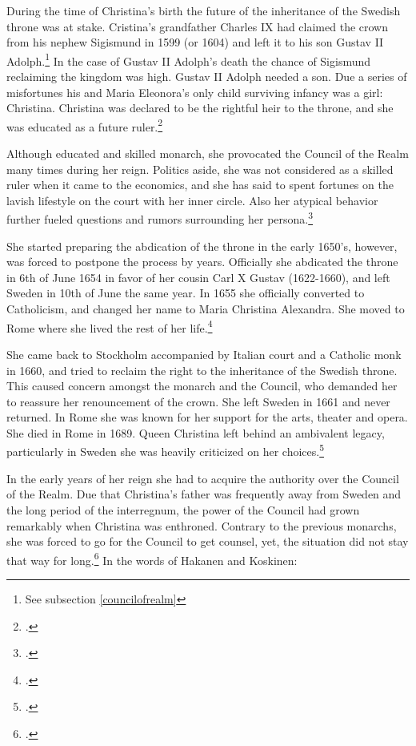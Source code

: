 During the time of Christina's birth the future of the inheritance of the Swedish throne was at stake. Cristina's grandfather Charles IX had claimed the crown from his nephew Sigismund in 1599 (or 1604) and left it to his son Gustav II Adolph.\footnote{See subsection \ref{councilofrealm}} In the case of Gustav II Adolph's death the chance of Sigismund reclaiming the kingdom was high. Gustav II Adolph needed a son. Due a series of misfortunes his and Maria Eleonora's only child surviving infancy was a girl: Christina. Christina was declared to be the rightful heir to the throne, and she was educated as a future ruler.\footcite[pp. 185-189.]{lappalainen14}

Although educated and skilled monarch, she provocated the Council of the Realm many times during her reign. Politics aside, she was not considered as a skilled ruler when it came to the economics, and she has said to spent fortunes on the lavish lifestyle on the court with her inner circle. Also her atypical behavior further fueled questions and rumors surrounding her persona.\footcite{makelaAlitaloEtAl2000}

She started preparing the abdication of the throne in the early 1650's, however, was forced to postpone the process by years. Officially she abdicated the throne in 6th of June 1654 in favor of her cousin Carl X Gustav (1622-1660), and left Sweden in 10th of June the same year. In 1655 she officially converted to Catholicism, and changed her name to Maria Christina Alexandra. She moved to Rome where she lived the rest of her life.\footcite{makelaAlitaloEtAl2000}

She came back to Stockholm accompanied by Italian court and a Catholic monk in 1660, and tried to reclaim the right to the inheritance of the Swedish throne. This caused concern amongst the monarch and the Council, who demanded her to reassure her renouncement of the crown. She left Sweden in 1661 and never returned. In Rome she was known for her support for the arts, theater and opera. She died in Rome in 1689. Queen Christina left behind an ambivalent legacy, particularly in Sweden she was heavily criticized on her choices.\footcite{makelaAlitaloEtAl2000}

In the early years of her reign she had to acquire the authority over the Council of the Realm. Due that Christina's father was frequently away from Sweden and the long period of the interregnum, the power of the Council had grown remarkably when Christina was enthroned. Contrary to the previous monarchs, she was forced to go for the Council to get counsel, yet, the situation did not stay that way for long.\footcite[p. 64.]{HakanenAKoskinen2017} In the words of Hakanen and Koskinen: 

